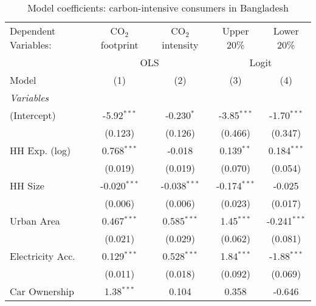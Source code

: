 
\begin{table}[htbp!]
   \centering
   \small
   \begin{adjustbox}{width = 1\textwidth, max height = 0.95\textheight, center}
      \begin{threeparttable}[b]
         \caption{\label{tab:Logit_1_BGD} Model coefficients: carbon-intensive consumers in Bangladesh}
         \begin{tabular}{lcccc}
            \tabularnewline \midrule \midrule
            Dependent Variables: & CO$_{2}$ footprint & CO$_{2}$ intensity & Upper 20\%     & Lower 20\%\\   
             & \multicolumn{2}{c}{OLS} & \multicolumn{2}{c}{Logit} \\ 
            Model                & (1)                & (2)                & (3)            & (4)\\  
            \midrule
            \emph{Variables}\\
            (Intercept)          & -5.92$^{***}$      & -0.230$^{*}$       & -3.85$^{***}$  & -1.70$^{***}$\\   
                                 & (0.123)            & (0.126)            & (0.466)        & (0.347)\\   
            HH Exp. (log)        & 0.768$^{***}$      & -0.018             & 0.139$^{**}$   & 0.184$^{***}$\\   
                                 & (0.019)            & (0.019)            & (0.070)        & (0.054)\\   
            HH Size              & -0.020$^{***}$     & -0.038$^{***}$     & -0.174$^{***}$ & -0.025\\   
                                 & (0.006)            & (0.006)            & (0.023)        & (0.017)\\   
            Urban Area           & 0.467$^{***}$      & 0.585$^{***}$      & 1.45$^{***}$   & -0.241$^{***}$\\   
                                 & (0.021)            & (0.029)            & (0.062)        & (0.081)\\   
            Electricity Acc.     & 0.129$^{***}$      & 0.528$^{***}$      & 1.84$^{***}$   & -1.88$^{***}$\\   
                                 & (0.011)            & (0.018)            & (0.092)        & (0.069)\\   
            Car Ownership        & 1.38$^{***}$       & 0.104              & 0.358          & -0.646\\   

\end{tabular}
\end{threeparttable}
\end{adjustbox}
\end{table}

